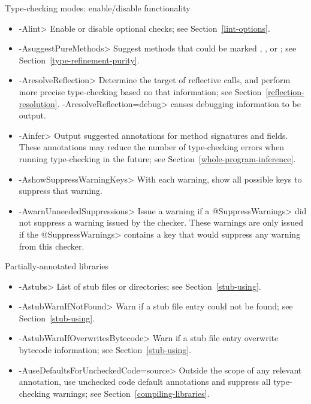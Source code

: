 Type-checking modes:  enable/disable functionality
\begin{itemize}
\item \<-Alint>
  Enable or disable optional checks; see Section~\ref{lint-options}.
\item \<-AsuggestPureMethods>
  Suggest methods that could be marked
  ,
  ,
  or ; see
  Section~\ref{type-refinement-purity}.
\item \<-AresolveReflection>
  Determine the target of reflective calls, and perform more precise
  type-checking based no that information; see
  Section~\ref{reflection-resolution}.  \<-AresolveReflection=debug> causes
  debugging information to be output.
\item \<-Ainfer>
  Output suggested annotations for method signatures and fields.
  These annotations may reduce the number of type-checking
  errors when running type-checking in the future; see
  Section~\ref{whole-program-inference}.
\item \<-AshowSuppressWarningKeys>
  With each warning, show all possible keys to suppress that warning.
\item \<-AwarnUnneededSuppressions>
  Issue a warning if a \<@SuppressWarnings> did not suppress a warning issued by
  the checker.  These warnings are only issued if the \<@SuppressWarnings>
  contains a key that would suppress any warning from this checker.
\end{itemize}

Partially-annotated libraries
\begin{itemize}
\item \<-Astubs>
  List of stub files or directories; see Section~\ref{stub-using}.
\item \<-AstubWarnIfNotFound>
  Warn if a stub file entry could not be found; see Section~\ref{stub-using}.
\item \<-AstubWarnIfOverwritesBytecode>
  Warn if a stub file entry overwrite bytecode information; see
  Section~\ref{stub-using}.
\item \<-AuseDefaultsForUncheckedCode=source>
  Outside the scope of any relevant
   annotation, use unchecked code
  default annotations and suppress all type-checking warnings; see
  Section~\ref{compiling-libraries}.
\end{itemize}

